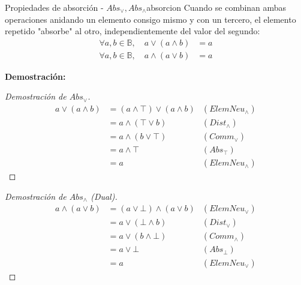 \documentclass[12pt,a4paper]{article}
\newcommand{\desplegable}[2]{%
  \par\vspace{1ex}\noindent
  \textbf{Demostración:}
  \vspace{1ex}
  
  #2
  \par\vspace{1ex}
}
\begin{document}
\begin{teorema}{Propiedades de absorción - $Abs_{\vee}, Abs_{\wedge}$}{absorcion}
Cuando se combinan ambas operaciones anidando un elemento consigo mismo y con un tercero, el elemento repetido "absorbe" al otro, independientemente del valor del segundo:
\begin{align*}
    \forall a, b \in \mathbb{B}, \quad a \vee (a \wedge b) &= a \\
    \forall a, b \in \mathbb{B}, \quad a \wedge (a \vee b) &= a
\end{align*}
\end{teorema}
\desplegable{proof_absorcion}{
\begin{proof}[Demostración de $Abs_\vee$]
\begin{align*}
    a \vee (a \wedge b) &= (a \wedge \top) \vee (a \wedge b) & (ElemNeu_\wedge) \\
                        &= a \wedge (\top \vee b) & (Dist_\wedge) \\
                        &= a \wedge (b \vee \top) & (Comm_\vee) \\
                        &= a \wedge \top & (Abs_\top) \\
                        &= a & (ElemNeu_\wedge)
\end{align*}
\end{proof}
\begin{proof}[Demostración de $Abs_\wedge$ (Dual)]
\begin{align*}
    a \wedge (a \vee b) &= (a \vee \bot) \wedge (a \vee b) & (ElemNeu_\vee) \\
                        &= a \vee (\bot \wedge b) & (Dist_\vee) \\
                        &= a \vee (b \wedge \bot) & (Comm_\wedge) \\
                        &= a \vee \bot & (Abs_\bot) \\
                        &= a & (ElemNeu_\vee)
\end{align*}
\end{proof}
}
\end{document}

